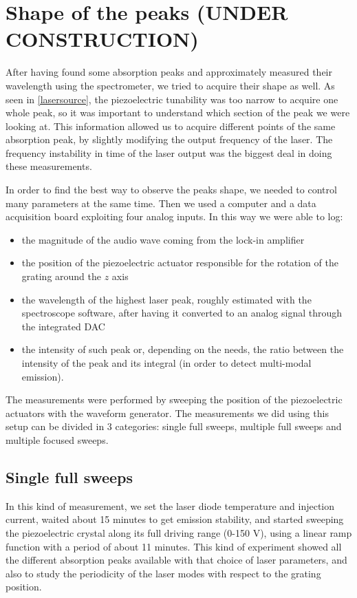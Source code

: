 \section{Shape of the peaks (UNDER CONSTRUCTION)}\label{shapeaks}
After having found some absorption peaks and approximately measured their wavelength using the spectrometer, we tried to acquire their shape as well. As seen in \cref{lasersource}, the piezoelectric tunability was too narrow to acquire one whole peak, so it was important to understand which section of the peak we were looking at. This information allowed us to acquire different points of the same absorption peak, by slightly modifying the output frequency of the laser. The frequency instability in time of the laser output was the biggest deal in doing these measurements. 

In order to find the best way to observe the peaks shape, we needed to control many parameters at the same time. Then we used a computer and a data acquisition board exploiting four analog inputs. In this way we were able to log:
\begin{itemize}
	\item the magnitude of the audio wave coming from the lock-in amplifier
	\item the position of the piezoelectric actuator responsible for the rotation of the grating around the $z$ axis
	\item the wavelength of the highest laser peak, roughly estimated with the spectroscope software, after having it converted to an analog signal through the integrated DAC
	\item the intensity of such peak or, depending on the needs, the ratio between the intensity of the peak and its integral (in order to detect multi-modal emission).
\end{itemize}
The measurements were performed by sweeping the position of the piezoelectric actuators with the waveform generator. 
The measurements we did using this setup can be divided in 3 categories: single full sweeps, multiple full sweeps and multiple focused sweeps. 
		\subsection{Single full sweeps} 
In this kind of measurement, we set the laser diode temperature and injection current, waited about 15 minutes to get emission stability, and started sweeping the piezoelectric crystal along its full driving range (0-150 V), using a linear ramp function with a period of about 11 minutes. This kind of experiment showed all the different absorption peaks available with that choice of laser parameters, and also to study the periodicity of the laser modes with respect to the grating position.

